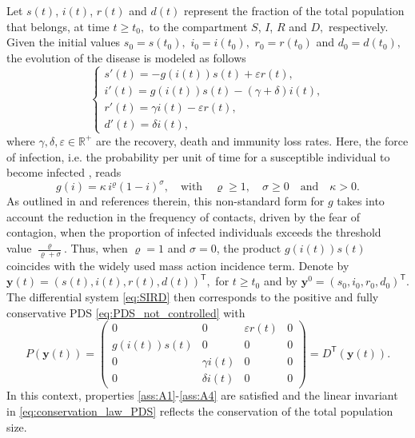 \documentclass[10pt]{article}
\theoremstyle{remark}
\newcommand{\tpose}{^\mathsf{T}}
\theoremstyle{definition}
\theoremstyle{remark}
\begin{document}
Let $s(t)$, $i(t)$, $r(t)$ and $d(t)$ represent the fraction of the total population that belongs, at time $t\geq t_0,$ to the compartment $S$, $I$, $R$ and $D,$ respectively. Given the initial values $s_0=s(t_0),$ $i_0=i(t_0),$ $r_0=r(t_0)$ and $d_0=d(t_0),$ the evolution of the disease is modeled as follows
\begin{equation} \label{eq:SIRD}
    \begin{cases}
        s'(t) = - g(i(t)) s(t) + \varepsilon r(t), \\
        i'(t) =  g(i(t)) s(t) - (\gamma + \delta) i(t), \\
        r' (t) = \gamma i(t) - \varepsilon r(t), \\
        d'(t) = \delta i(t),
    \end{cases}
\end{equation}
where $\gamma,\delta, \varepsilon \in \mathbb{R}^+$ are the recovery, death and immunity loss rates. Here, the force of infection, i.e. the probability per unit of time for a susceptible individual to become infected \cite{DiekmannHeesterbeek2000}, reads 
\begin{equation*}
    g(i)=\kappa \, i^\varrho  (1-i)^\sigma, \quad \text{with} \quad \varrho\geq 1, \quad \sigma \geq 0 \quad \text{and} \quad \kappa >0.
\end{equation*}
As outlined in \cite{DOnofrio, CAPASSO197843, vandenDriessche2000} and references therein, this non-standard form for $g$ takes into account the reduction in the frequency of contacts, driven by the fear of contagion, when the proportion of infected individuals exceeds the threshold value $\frac{\varrho}{\varrho+\sigma}$. Thus, when $\varrho=1$ and $\sigma=0$, the product $g(i(t)) s(t)$ coincides with the widely used mass action incidence term. Denote by $\bm{y}(t)=(s(t),i(t),r(t),d(t))\tpose,$ for $t\geq t_0$ and by $\bm{y}^0=(s_0,i_0,r_0,d_0)\tpose.$ The differential system \eqref{eq:SIRD} then corresponds to the positive and fully conservative PDS \eqref{eq:PDS_not_controlled} with
\begin{equation}\label{eq:SIRD_PDS}
    P(\bm{y}(t))=\begin{pmatrix}
        0 & 0 & \varepsilon r(t) & 0 \\
         g(i(t)) s(t) & 0 & 0 & 0 \\
          0 & \gamma i(t) & 0 & 0 \\
          0 & \delta i(t) & 0 & 0
    \end{pmatrix}=D\tpose(\bm{y}(t)).
\end{equation}
In this context, properties \ref{ass:A1}-\ref{ass:A4} are satisfied and the linear invariant in \eqref{eq:conservation_law_PDS}  reflects the conservation of the total population size. 
\end{document}
